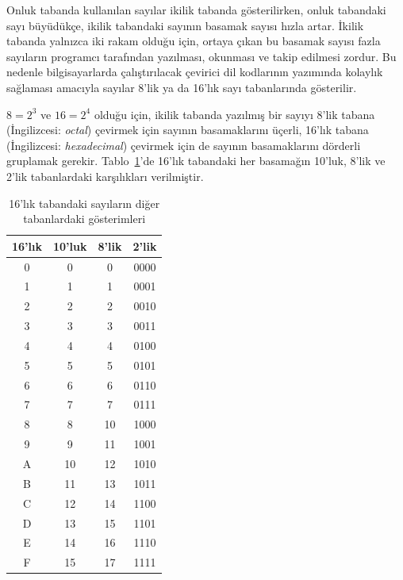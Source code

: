 Onluk tabanda kullanılan sayılar ikilik tabanda gösterilirken, onluk tabandaki sayı büyüdükçe, ikilik tabandaki sayının basamak sayısı hızla artar. İkilik tabanda yalnızca iki rakam olduğu için, ortaya çıkan bu basamak sayısı fazla sayıların programcı tarafından yazılması, okunması ve takip edilmesi zordur. Bu nedenle bilgisayarlarda çalıştırılacak çevirici dil kodlarının yazımında kolaylık sağlaması amacıyla sayılar 8'lik ya da 16'lık sayı tabanlarında gösterilir.

$8 = 2^3$ ve $16 = 2^4$ olduğu için, ikilik tabanda yazılmış bir sayıyı 8'lik tabana (İngilizcesi: \textit{octal}) çevirmek için sayının basamaklarını üçerli, 16'lık tabana (İngilizcesi: \textit{hexadecimal}) çevirmek için de sayının basamaklarını dörderli gruplamak gerekir. Tablo~\ref{tab:hex-tablo}'de 16'lık tabandaki her basamağın 10'luk, 8'lik ve 2'lik tabanlardaki karşılıkları verilmiştir.

\begin{table}[H]
\centering
\caption{16'lık tabandaki sayıların diğer tabanlardaki gösterimleri}
\label{tab:hex-tablo}
\begin{tabular}{cccc}
\toprule
\textbf{16'lık} & \textbf{10'luk} & \textbf{8'lik} & \textbf{2'lik} \\
\midrule
0 & 0  & 0  & 0000 \\
1 & 1  & 1  & 0001 \\
2 & 2  & 2  & 0010 \\
3 & 3  & 3  & 0011 \\
4 & 4  & 4  & 0100 \\
5 & 5  & 5  & 0101 \\
6 & 6  & 6  & 0110 \\
7 & 7  & 7  & 0111 \\
8 & 8  & 10 & 1000 \\
9 & 9  & 11 & 1001 \\
A & 10 & 12 & 1010 \\
B & 11 & 13 & 1011 \\
C & 12 & 14 & 1100 \\
D & 13 & 15 & 1101 \\
E & 14 & 16 & 1110 \\
F & 15 & 17 & 1111 \\
\bottomrule
\end{tabular}
\end{table}

